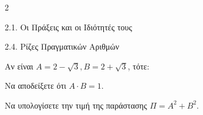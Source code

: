 \begin{ylh}{2}
    \item 2.1. Οι Πράξεις και οι Ιδιότητές τους
    \item 2.4. Ρίζες Πραγματικών Αριθμών
\end{ylh}
Αν είναι $A = 2 - \sqrt{3}, B = 2 + \sqrt{3}$, τότε:
\begin{alist}
\item Να αποδείξετε ότι $A \cdot B = 1$. 
\item Να υπολογίσετε την τιμή της παράστασης $\Pi = A^2 + B^2$. 
\end{alist}

